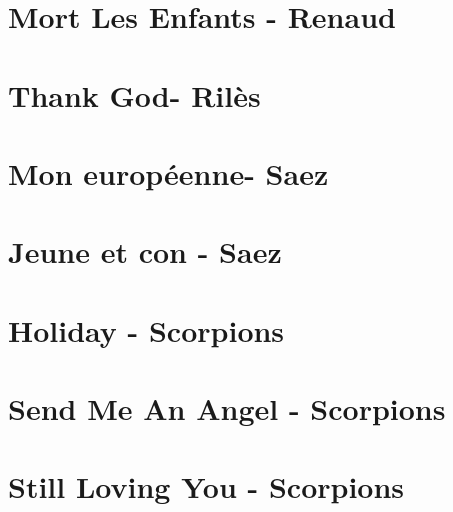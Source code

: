 \documentclass{guitartabs}
\begin{document}
\section{Mort Les Enfants - Renaud}
\begin{guitar}

\end{guitar}

\section{Thank God- Rilès}
\begin{guitar}

\end{guitar}

\section{Mon européenne- Saez}
\begin{guitar}

\end{guitar}


\section{Jeune et con - Saez}
\begin{guitar}

\end{guitar}

\section*{Holiday - Scorpions}
\begin{guitar}

\end{guitar}

\section{Send Me An Angel - Scorpions}
\begin{guitar}

\end{guitar}


\section{Still Loving You - Scorpions}
\begin{guitar}

\end{guitar}
\end{document}
